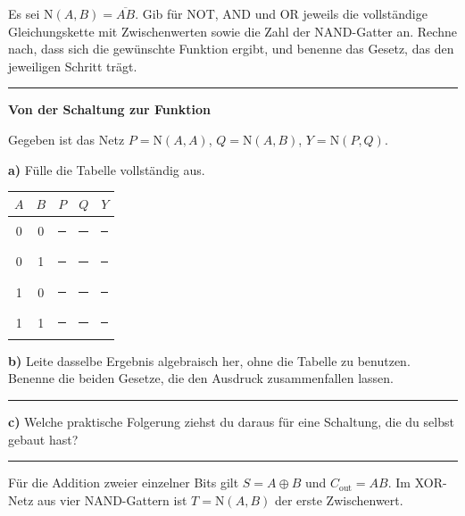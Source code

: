 \documentclass[10pt,a4paper]{article}
\newcommand{\titlepagepart}[2]{\vspace*{-4mm}{\sffamily\small #1}\par{\sffamily\LARGE\bfseries #2}\par\vspace{2mm}}
\newcommand{\block}[1]{\par\vspace{2mm}{\sffamily\large\bfseries #1}\par}
\newcommand{\antwort}[1]{\par\vspace{#1}\hrule\vspace{3mm}}
\newcommand{\N}{\mathrm{N}}
\newcommand{\lin}{\rule{11mm}{0.3pt}}
\begin{document}
\block{3. Die NAND-Aufbauten als Gleichung}
Es sei $\N(A,B)=\overline{AB}$. Gib für NOT, AND und OR jeweils die vollständige
Gleichungskette mit Zwischenwerten sowie die Zahl der NAND-Gatter an. Rechne
nach, dass sich die gewünschte Funktion ergibt, und benenne das Gesetz, das
den jeweiligen Schritt trägt.
\antwort{45mm}

\newpage
\titlepagepart{03 / NETZE RECHNEN · CA. 16 MINUTEN}{Von der Schaltung zur Funktion}

\block{4. Ein unbekanntes Netz bestimmen}
Gegeben ist das Netz $P=\N(A,A)$, \quad $Q=\N(A,B)$, \quad $Y=\N(P,Q)$.
\begin{center}
\end{center}
\textbf{a)} Fülle die Tabelle vollständig aus.
\begin{center}
\begin{tabular}{cc|ccc}\toprule
$A$&$B$&$P$&$Q$&$Y$\\\midrule
0&0&\lin&\lin&\lin\\
0&1&\lin&\lin&\lin\\
1&0&\lin&\lin&\lin\\
1&1&\lin&\lin&\lin\\\bottomrule
\end{tabular}
\end{center}
\textbf{b)} Leite dasselbe Ergebnis algebraisch her, ohne die Tabelle zu
benutzen. Benenne die beiden Gesetze, die den Ausdruck zusammenfallen lassen.
\antwort{20mm}
\textbf{c)} Welche praktische Folgerung ziehst du daraus für eine Schaltung,
die du selbst gebaut hast?
\antwort{11mm}

\block{5. Halbaddierer: die Brücke zu Tag 4}
Für die Addition zweier einzelner Bits gilt
$S=A\oplus B$ und $C_{\text{out}}=AB$. Im XOR-Netz aus vier NAND-Gattern ist
$T=\N(A,B)$ der erste Zwischenwert.
\end{document}
